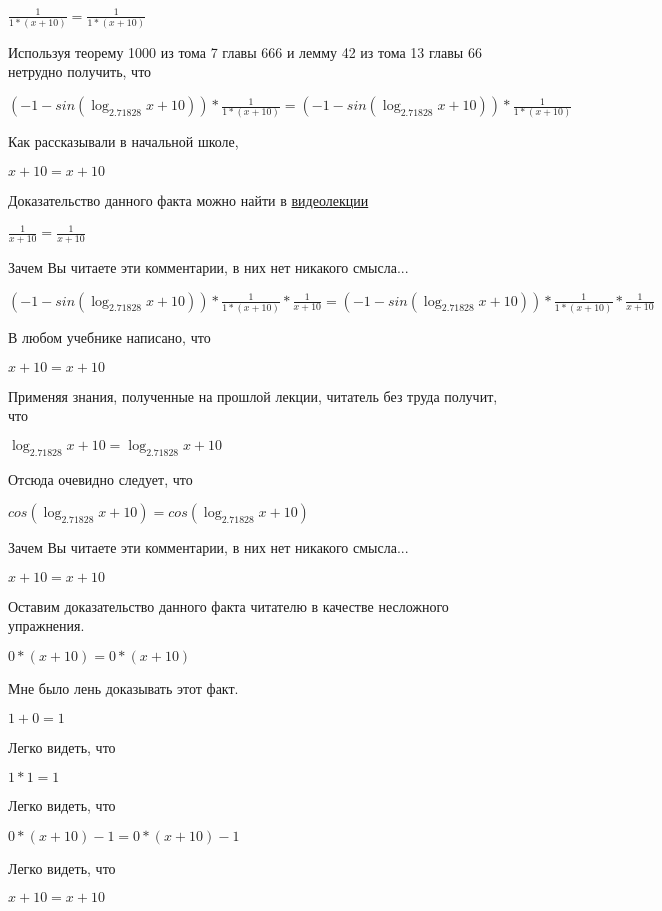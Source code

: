 \documentclass[12pt,a4paper,fleqn]{article}
\theoremstyle{definition}
\begin{document}
$\frac{ 1 }{ 1  * ( x  +  10 )}
 = \frac{ 1 }{ 1  * ( x  +  10 )}
$

Используя теорему 1000 из тома 7 главы 666 и лемму 42 из тома 13 главы 66 нетрудно получить, что 

$( -1  - sin(\log_{ 2.71828 }{ x  +  10 })) * \frac{ 1 }{ 1  * ( x  +  10 )}
 = ( -1  - sin(\log_{ 2.71828 }{ x  +  10 })) * \frac{ 1 }{ 1  * ( x  +  10 )}
$

Как рассказывали в начальной школе, 

$ x  +  10  =  x  +  10 $

Доказательство данного факта можно найти в \href{https://www.youtube.com/watch?v=dQw4w9WgXcQ}{видеолекции} 

$\frac{ 1 }{ x  +  10 }
 = \frac{ 1 }{ x  +  10 }
$

Зачем Вы читаете эти комментарии, в них нет никакого смысла... 

$( -1  - sin(\log_{ 2.71828 }{ x  +  10 })) * \frac{ 1 }{ 1  * ( x  +  10 )}
 * \frac{ 1 }{ x  +  10 }
 = ( -1  - sin(\log_{ 2.71828 }{ x  +  10 })) * \frac{ 1 }{ 1  * ( x  +  10 )}
 * \frac{ 1 }{ x  +  10 }
$

В любом учебнике написано, что 

$ x  +  10  =  x  +  10 $

Применяя знания, полученные на прошлой лекции, читатель без труда получит, что 

$\log_{ 2.71828 }{ x  +  10 } = \log_{ 2.71828 }{ x  +  10 }$

Отсюда очевидно следует, что 

$cos(\log_{ 2.71828 }{ x  +  10 }) = cos(\log_{ 2.71828 }{ x  +  10 })$

Зачем Вы читаете эти комментарии, в них нет никакого смысла... 

$ x  +  10  =  x  +  10 $

Оставим доказательство данного факта читателю в качестве несложного упражнения. 

$ 0  * ( x  +  10 ) =  0  * ( x  +  10 )$

Мне было лень доказывать этот факт.

$ 1  +  0  =  1 $

Легко видеть, что 

$ 1  *  1  =  1 $

Легко видеть, что 

$ 0  * ( x  +  10 ) -  1  =  0  * ( x  +  10 ) -  1 $

Легко видеть, что 

$ x  +  10  =  x  +  10 $
\end{document}
